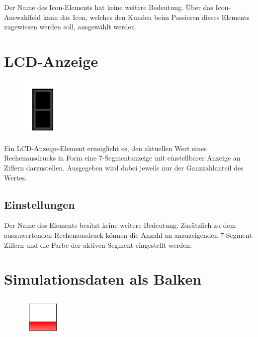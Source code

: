 Der Name des Icon-Elements hat keine weitere Bedeutung. Über das Icon-Auswahlfeld kann das Icon,
welches den Kunden beim Passieren dieses Elements zugewiesen werden soll, ausgewählt werden.


\section{LCD-Anzeige}
\label{ref:ModelElementAnimationLCD}

\begin{figure}
\vspace{-22pt}
\includegraphics[width=2cm]{imageModelElementAnimationLCD.png}
\vspace{-22pt}
\end{figure}

Ein LCD-Anzeige-Element ermöglicht es, den aktuellen Wert eines Rechenausdrucks
in Form eine 7-Segmentanzeige mit einstellbarer Anzeige an Ziffern darzustellen.
Ausgegeben wird dabei jeweils nur der Ganzzahlanteil des Wertes.

\subsection*{Einstellungen}

Der Name des Elements besitzt keine weitere Bedeutung.
Zusätzlich zu dem auszuwertenden Rechenausdruck können
die Anzahl an anzuzeigenden 7-Segment-Ziffern und die
Farbe der aktiven Segment eingestellt werden.


\section{Simulationsdaten als Balken}
\label{ref:ModelElementAnimationBar}

\begin{figure}
\vspace{-22pt}
\includegraphics[width=2cm]{imageModelElementAnimationBar.png}
\vspace{-22pt}
\end{figure}

